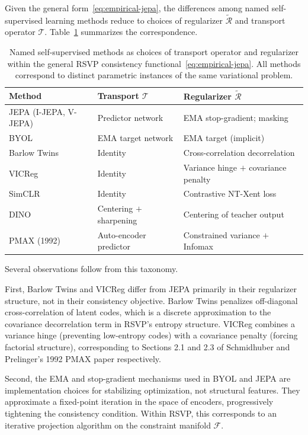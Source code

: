 \documentclass[12pt, oneside]{article}
\begin{document}
Given the general form~\eqref{eq:empirical-jepa}, the differences among named self-supervised learning methods reduce to choices of regularizer $\widetilde{\mathcal{R}}$ and transport operator $\mathcal{T}$. Table~\ref{tab:taxonomy} summarizes the correspondence.

\begin{table}[ht]
\centering
\renewcommand{\arraystretch}{1.4}
\begin{tabular}{@{} l l l @{}}
\toprule
\textbf{Method} & \textbf{Transport $\mathcal{T}$} & \textbf{Regularizer $\widetilde{\mathcal{R}}$} \\
\midrule
JEPA (I-JEPA, V-JEPA) & Predictor network & EMA stop-gradient; masking \\
BYOL & EMA target network & EMA target (implicit) \\
Barlow Twins & Identity & Cross-correlation decorrelation \\
VICReg & Identity & Variance hinge $+$ covariance penalty \\
SimCLR & Identity & Contrastive NT-Xent loss \\
DINO & Centering $+$ sharpening & Centering of teacher output \\
PMAX (1992) & Auto-encoder predictor & Constrained variance $+$ Infomax \\
\bottomrule
\end{tabular}
\caption{Named self-supervised methods as choices of transport operator and regularizer within the general RSVP consistency functional~\eqref{eq:empirical-jepa}. All methods correspond to distinct parametric instances of the same variational problem.}
\label{tab:taxonomy}
\end{table}

Several observations follow from this taxonomy.

First, Barlow Twins and VICReg differ from JEPA primarily in their regularizer structure, not in their consistency objective. Barlow Twins penalizes off-diagonal cross-correlation of latent codes, which is a discrete approximation to the covariance decorrelation term in RSVP's entropy structure. VICReg combines a variance hinge (preventing low-entropy codes) with a covariance penalty (forcing factorial structure), corresponding to Sections 2.1 and 2.3 of Schmidhuber and Prelinger's 1992 PMAX paper respectively.

Second, the EMA and stop-gradient mechanisms used in BYOL and JEPA are implementation choices for stabilizing optimization, not structural features. They approximate a fixed-point iteration in the space of encoders, progressively tightening the consistency condition. Within RSVP, this corresponds to an iterative projection algorithm on the constraint manifold $\mathcal{F}$.
\end{document}
